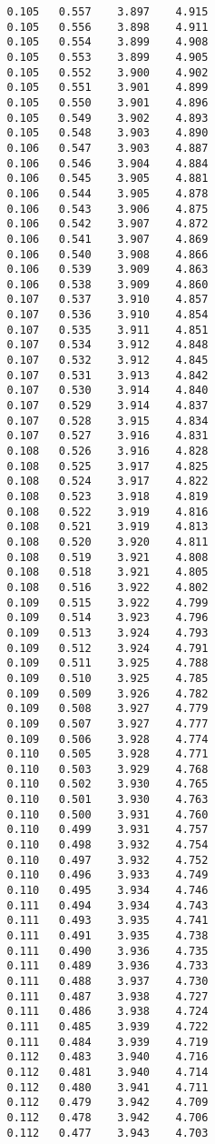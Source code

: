 \begin{verbatim}
   0.105   0.557    3.897    4.915
   0.105   0.556    3.898    4.911
   0.105   0.554    3.899    4.908
   0.105   0.553    3.899    4.905
   0.105   0.552    3.900    4.902
   0.105   0.551    3.901    4.899
   0.105   0.550    3.901    4.896
   0.105   0.549    3.902    4.893
   0.105   0.548    3.903    4.890
   0.106   0.547    3.903    4.887
   0.106   0.546    3.904    4.884
   0.106   0.545    3.905    4.881
   0.106   0.544    3.905    4.878
   0.106   0.543    3.906    4.875
   0.106   0.542    3.907    4.872
   0.106   0.541    3.907    4.869
   0.106   0.540    3.908    4.866
   0.106   0.539    3.909    4.863
   0.106   0.538    3.909    4.860
   0.107   0.537    3.910    4.857
   0.107   0.536    3.910    4.854
   0.107   0.535    3.911    4.851
   0.107   0.534    3.912    4.848
   0.107   0.532    3.912    4.845
   0.107   0.531    3.913    4.842
   0.107   0.530    3.914    4.840
   0.107   0.529    3.914    4.837
   0.107   0.528    3.915    4.834
   0.107   0.527    3.916    4.831
   0.108   0.526    3.916    4.828
   0.108   0.525    3.917    4.825
   0.108   0.524    3.917    4.822
   0.108   0.523    3.918    4.819
   0.108   0.522    3.919    4.816
   0.108   0.521    3.919    4.813
   0.108   0.520    3.920    4.811
   0.108   0.519    3.921    4.808
   0.108   0.518    3.921    4.805
   0.108   0.516    3.922    4.802
   0.109   0.515    3.922    4.799
   0.109   0.514    3.923    4.796
   0.109   0.513    3.924    4.793
   0.109   0.512    3.924    4.791
   0.109   0.511    3.925    4.788
   0.109   0.510    3.925    4.785
   0.109   0.509    3.926    4.782
   0.109   0.508    3.927    4.779
   0.109   0.507    3.927    4.777
   0.109   0.506    3.928    4.774
   0.110   0.505    3.928    4.771
   0.110   0.503    3.929    4.768
   0.110   0.502    3.930    4.765
   0.110   0.501    3.930    4.763
   0.110   0.500    3.931    4.760
   0.110   0.499    3.931    4.757
   0.110   0.498    3.932    4.754
   0.110   0.497    3.932    4.752
   0.110   0.496    3.933    4.749
   0.110   0.495    3.934    4.746
   0.111   0.494    3.934    4.743
   0.111   0.493    3.935    4.741
   0.111   0.491    3.935    4.738
   0.111   0.490    3.936    4.735
   0.111   0.489    3.936    4.733
   0.111   0.488    3.937    4.730
   0.111   0.487    3.938    4.727
   0.111   0.486    3.938    4.724
   0.111   0.485    3.939    4.722
   0.111   0.484    3.939    4.719
   0.112   0.483    3.940    4.716
   0.112   0.481    3.940    4.714
   0.112   0.480    3.941    4.711
   0.112   0.479    3.942    4.709
   0.112   0.478    3.942    4.706
   0.112   0.477    3.943    4.703

\end{verbatim}
